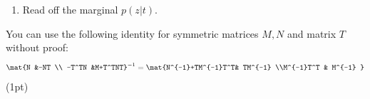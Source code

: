 \begin{enumerate}
\begin{enumerate}
  \item Read off the marginal $p(z|t)$.
\end{enumerate}
You can use the following identity for symmetric matrices $M,N$ and matrix $T$ without proof:
\begin{align*}
\mat{N &-NT \\ -T^TN  &M+T^TNT}^{-1} = \mat{N^{-1}+TM^{-1}T^T&  TM^{-1}  \\M^{-1}T^T & M^{-1} }
\end{align*}
(1pt)

\end{enumerate}


